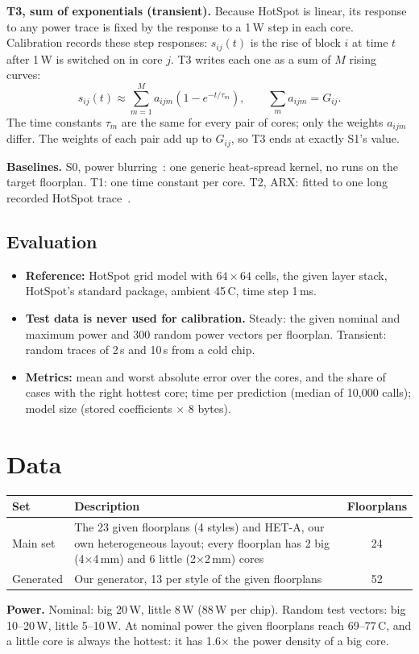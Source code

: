 \documentclass[11pt,a4paper]{article}
\newcommand{\degC}{\,\textdegree C}
\begin{document}
\textbf{T3, sum of exponentials (transient).} Because HotSpot is linear, its response to any power
trace is fixed by the response to a 1\,W step in each core. Calibration records these step
responses: $s_{ij}(t)$ is the rise of block $i$ at time $t$ after 1\,W is switched on in core $j$.
T3 writes each one as a sum of $M$ rising curves:
\begin{equation}
  s_{ij}(t) \approx \sum_{m=1}^{M} a_{ijm}\left(1 - e^{-t/\tau_m}\right),
  \qquad \sum_m a_{ijm} = G_{ij}.
  \label{eq:t3}
\end{equation}
The time constants $\tau_m$ are the same for every pair of cores; only the weights $a_{ijm}$
differ. The weights of each pair add up to $G_{ij}$, so T3 ends at exactly S1's value.

\textbf{Baselines.} S0, power blurring~\cite{blurring}: one generic heat-spread kernel, no runs on
the target floorplan. T1: one time constant per core. T2, ARX: fitted to one long recorded HotSpot
trace~\cite{coskun09,singla15}.

\subsection{Evaluation}
\begin{itemize}
  \item \textbf{Reference:} HotSpot grid model with $64\times64$ cells, the given layer stack,
        HotSpot's standard package, ambient 45\degC, time step 1\,ms.
  \item \textbf{Test data is never used for calibration.} Steady: the given nominal and maximum
        power and 300 random power vectors per floorplan. Transient: random traces of 2\,s and
        10\,s from a cold chip.
  \item \textbf{Metrics:} mean and worst absolute error over the cores, and the share of cases
        with the right hottest core; time per prediction (median of 10{,}000 calls); model size
        (stored coefficients $\times$ 8 bytes).
\end{itemize}

\section{Data}
\begin{center}
\small
\begin{tabular}{@{}l p{9.6cm} c@{}}
\toprule
Set & Description & Floorplans \\
\midrule
Main set & The 23 given floorplans (4 styles) and HET-A, our own heterogeneous layout; every
           floorplan has 2 big (4$\times$4\,mm) and 6 little (2$\times$2\,mm) cores & 24 \\
Generated & Our generator, 13 per style of the given floorplans & 52 \\
\bottomrule
\end{tabular}
\end{center}
\textbf{Power.} Nominal: big 20\,W, little 8\,W (88\,W per chip). Random test vectors: big
10--20\,W, little 5--10\,W. At nominal power the given floorplans reach 69--77\degC, and a little
core is always the hottest: it has 1.6$\times$ the power density of a big core.
\end{document}
